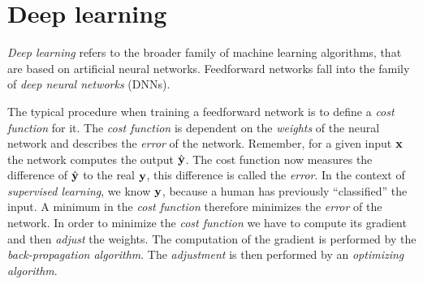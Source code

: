 \section{Deep learning}
\label{sec:deep-learning}

\emph{Deep learning} refers to the broader family of machine learning algorithms, that are based on artificial neural networks.
Feedforward networks fall into the family of \emph{deep neural networks} (DNNs).

The typical procedure when training a feedforward network is to define a \emph{cost function} for it.
The \emph{cost function} is dependent on the \emph{weights} of the neural network and describes the \emph{error} of the network.
Remember, for a given input \(\mathbf{x}\) the network computes the output \(\hat{\mathbf{y}}\).
The cost function now measures the difference of \(\hat{\mathbf{y}}\) to the real \(\mathbf{y}\), this difference is called the \emph{error}.
In the context of \emph{supervised learning}, we know \(\mathbf{y}\), because a human has previously \enquote{classified} the input.
A minimum in the \emph{cost function} therefore minimizes the \emph{error} of the network.
In order to minimize the \emph{cost function} we have to compute its gradient and then \emph{adjust} the weights.
The computation of the gradient is performed by the \emph{back-propagation algorithm}.
The \emph{adjustment} is then performed by an \emph{optimizing algorithm}.